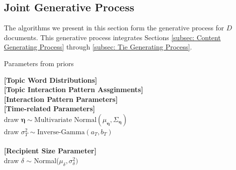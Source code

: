  \subsection{Joint Generative Process} \label{subsec: Joint Generative Process of Document}
The algorithms we present in this section form the generative process for $D$ documents. This generative process integrates Sections \ref{subsec: Content Generating Process} through \ref{subsec: Tie Generating Process}.  
\begin{algorithm}[H]
	\SetAlgoLined
	\caption{Parameters from priors}
\textbf{[Topic Word Distributions]}\\
	\vspace{0.2cm}
		\textbf{[Topic Interaction Pattern Assginments]}\\
			\vspace{0.2cm}
		\textbf{[Interaction Pattern Parameters]}\\
		\vspace{0.2cm}
	\textbf{[Time-related Parameters]}\\
		draw $\boldsymbol{\eta}\sim \mbox{Multivariate Normal}(\mu_{\boldsymbol{\eta}}, \Sigma_{\boldsymbol{\eta}})$\\
			draw $\sigma_T^2\sim \mbox{Inverse-Gamma}(a_T, b_T)$\\\\
	\textbf{[Recipient Size Parameter]}\\
		draw $\delta$ $\sim$ Normal($\mu_\delta, \sigma^2_\delta)$
\end{algorithm}

